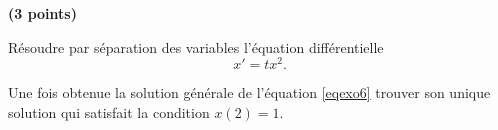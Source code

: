 \begin{exercice}\label{exoExosenvrac-0006}\textbf{ (3 points) }

Résoudre par séparation des variables l'équation différentielle 
\begin{equation}\label{eqexo6}
  x'=tx^2.
\end{equation}

Une fois obtenue la solution générale de l'équation \eqref{eqexo6} trouver son unique solution qui satisfait la condition $x(2)=1$. 

  
\end{exercice}
